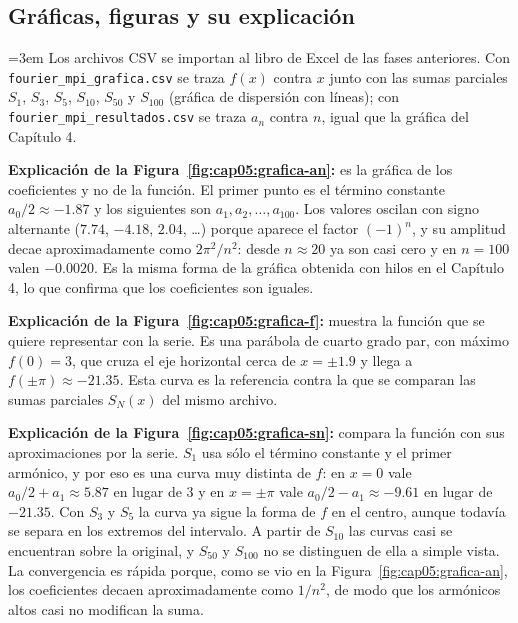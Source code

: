 \subsection{Gráficas, figuras y su explicación}

{\emergencystretch=3em Los archivos CSV se importan al libro de Excel de las fases anteriores. Con \texttt{fourier\_\allowbreak mpi\_\allowbreak grafica.csv} se traza $f(x)$ contra $x$ junto con las sumas parciales $S_1$, $S_3$, $S_5$, $S_{10}$, $S_{50}$ y $S_{100}$ (gráfica de dispersión con líneas); con \texttt{fourier\_\allowbreak mpi\_\allowbreak resultados.csv} se traza $a_n$ contra $n$, igual que la gráfica del Capítulo 4.\par}


\noindent\textbf{Explicación de la Figura~\ref{fig:cap05:grafica-an}:} es la gráfica de los coeficientes y no de la función. El primer punto es el término constante $a_0/2 \approx -1.87$ y los siguientes son $a_1, a_2, \dots, a_{100}$. Los valores oscilan con signo alternante ($7.74$, $-4.18$, $2.04$, \dots) porque aparece el factor $(-1)^n$, y su amplitud decae aproximadamente como $2\pi^2/n^2$: desde $n\approx 20$ ya son casi cero y en $n=100$ valen $-0.0020$. Es la misma forma de la gráfica obtenida con hilos en el Capítulo 4, lo que confirma que los coeficientes son iguales.


\noindent\textbf{Explicación de la Figura~\ref{fig:cap05:grafica-f}:} muestra la función que se quiere representar con la serie. Es una parábola de cuarto grado par, con máximo $f(0)=3$, que cruza el eje horizontal cerca de $x=\pm 1.9$ y llega a $f(\pm\pi)\approx -21.35$. Esta curva es la referencia contra la que se comparan las sumas parciales $S_N(x)$ del mismo archivo.


\noindent\textbf{Explicación de la Figura~\ref{fig:cap05:grafica-sn}:} compara la función con sus aproximaciones por la serie. $S_1$ usa sólo el término constante y el primer armónico, y por eso es una curva muy distinta de $f$: en $x=0$ vale $a_0/2+a_1\approx 5.87$ en lugar de $3$ y en $x=\pm\pi$ vale $a_0/2-a_1\approx -9.61$ en lugar de $-21.35$. Con $S_3$ y $S_5$ la curva ya sigue la forma de $f$ en el centro, aunque todavía se separa en los extremos del intervalo. A partir de $S_{10}$ las curvas casi se encuentran sobre la original, y $S_{50}$ y $S_{100}$ no se distinguen de ella a simple vista. La convergencia es rápida porque, como se vio en la Figura~\ref{fig:cap05:grafica-an}, los coeficientes decaen aproximadamente como $1/n^2$, de modo que los armónicos altos casi no modifican la suma.

